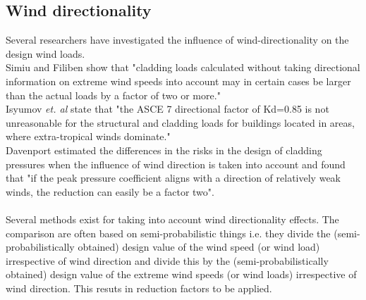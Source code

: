 \documentclass[fleqn]{article}
\begin{document}
\subsection{Wind directionality}
Several researchers have investigated the influence of wind-directionality on the design wind loads. \\
Simiu and Filiben \cite{Simiu_1981} show that "cladding loads calculated without taking directional information on extreme wind speeds into account may in certain cases be larger than the actual loads by a factor of two or more." \\
Isyumov \textit{et. al} \cite{Isyumov_2014} state that "the ASCE 7 directional factor of Kd=0.85 is not unreasonable for the structural and cladding loads for buildings located in areas, where extra-tropical winds dominate." \\
Davenport \cite{Davenport_1983b} estimated the differences in the risks in the design of cladding pressures when the influence of wind direction is taken into account and found that "if the peak pressure coefficient aligns with a direction of relatively weak winds, the reduction can easily be a factor two". \\
\\
Several methods exist for taking into account wind directionality effects. The comparison are often based on semi-probabilistic things i.e. they divide the (semi-probabilistically obtained) design value of the wind speed (or wind load) irrespective of wind direction and divide this by the (semi-probabilistically obtained) design value of the extreme wind speeds (or wind loads) irrespective of wind direction. This resuts in reduction factors to be applied. 
\end{document}
